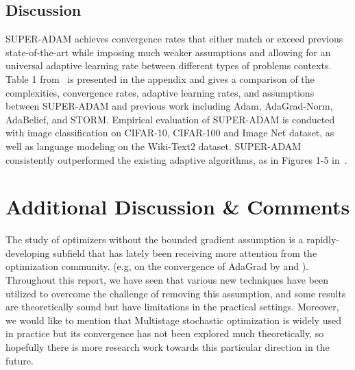 \documentclass{article}
\begin{document}
\subsection{Discussion}
SUPER-ADAM achieves convergence rates that either match or exceed previous state-of-the-art while imposing much weaker assumptions and allowing for an universal adaptive learning rate between different types of problems contexts.
Table 1 from~\cite{https://doi.org/10.48550/arxiv.2106.08208} is presented in the appendix and gives a comparison of the complexities, convergence rates, adaptive learning rates, and assumptions between SUPER-ADAM and previous work including Adam, AdaGrad-Norm, AdaBelief, and STORM.
Empirical evaluation of SUPER-ADAM is conducted with image classification on CIFAR-10, CIFAR-100 and Image Net dataset, as well as language modeling on the Wiki-Text2 dataset. SUPER-ADAM consistently outperformed the existing adaptive algorithms,
as in Figures 1-5 in~\cite{https://doi.org/10.48550/arxiv.2106.08208}.
\section{Additional Discussion \& Comments}
The study of optimizers without the bounded gradient assumption is a rapidly-developing subfield that has lately been receiving more attention from the optimization community. (e.g, on the convergence of AdaGrad by \cite{jin2022on} and \cite{https://doi.org/10.48550/arxiv.2202.05791}).
Throughout this report, we have seen that various new techniques have been utilized to overcome the challenge of removing this assumption, and some results are theoretically sound but have limitations in the practical settings. Moreover, we would like to mention that Multistage stochastic optimization is widely used in practice but its convergence has not been explored much theoretically, so hopefully there is more research work towards this particular direction in the future.
\newpage


%
\newpage
\appendix
\end{document}
